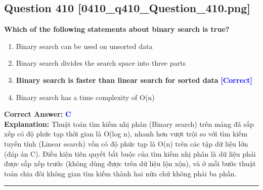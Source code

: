 \documentclass[11pt,a4paper]{article}
\begin{document}
\begin{minipage}{\textwidth}
\subsection*{Question 410 \quad \footnotesize{[0410\_q410\_Question\_410.png]}}
\noindent \textbf{Which of the following statements about binary search is true?}

\begin{enumerate}[label=\Alph*.]
    \item Binary search can be used on unsorted data
    \item Binary search divides the search space into three parts
    \item \textbf{Binary search is faster than linear search for sorted data} \hfill \textcolor{blue}{\textbf{[Correct]}}
    \item Binary search has a time complexity of O(n)
\end{enumerate}

\noindent \textbf{Correct Answer:} \textcolor{blue}{\textbf{C}} \\[2pt]
\noindent \textbf{Explanation:} Thuật toán tìm kiếm nhị phân (Binary search) trên mảng đã sắp xếp có độ phức tạp thời gian là O(log n), nhanh hơn vượt trội so với tìm kiếm tuyến tính (Linear search) vốn có độ phức tạp là O(n) trên các tập dữ liệu lớn (đáp án C). Điều kiện tiên quyết bắt buộc của tìm kiếm nhị phân là dữ liệu phải được sắp xếp trước (không dùng được trên dữ liệu lộn xộn), và ở mỗi bước thuật toán chia đôi không gian tìm kiếm thành hai nửa chứ không phải ba phần.

\par\vspace{0.3cm}
\hrule
\vspace{0.3cm}
\end{minipage}
\end{document}
